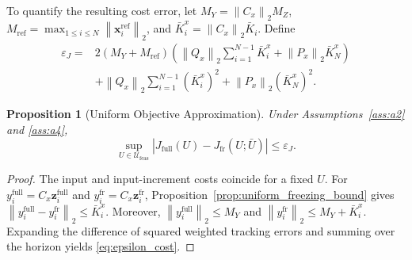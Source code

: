 \documentclass[journal]{IEEEtran}
\newtheorem{proposition}{Proposition}
\newcommand{\vx}{\mathbf{x}}
\newcommand{\vz}{\mathbf{z}}
\newcommand{\norm}[1]{\left\lVert #1\right\rVert}
\begin{document}
To quantify the resulting cost error, let $M_Y=\norm{C_x}_2M_Z$, $M_{\mathrm{ref}}=\max_{1\le i\le N}\norm{\vx_i^{\mathrm{ref}}}_2$, and $\bar K_i^x=\norm{C_x}_2\bar K_i$. Define
\begin{equation}
\begin{aligned}
\varepsilon_J={}&2(M_Y+M_{\mathrm{ref}})
 \left(\norm{Q_x}_2\sum_{i=1}^{N-1}\bar K_i^x
 +\norm{P_x}_2\bar K_N^x\right)\\
&+\norm{Q_x}_2\sum_{i=1}^{N-1}(\bar K_i^x)^2
 +\norm{P_x}_2(\bar K_N^x)^2.
\end{aligned}
\label{eq:epsilon_cost}
\end{equation}
\begin{proposition}[Uniform Objective Approximation]
\label{prop:uniform_cost_certificate}
Under Assumptions~\ref{ass:a2} and \ref{ass:a4},
\begin{equation}
 \sup_{U\in\mathcal U_{\mathrm{feas}}}
 \left|J_{\mathrm{full}}(U)-J_{\mathrm{fr}}(U;\bar U)\right|\le\varepsilon_J.
 \label{eq:uniform_cost_certificate}
\end{equation}
\end{proposition}
\begin{proof}
The input and input-increment costs coincide for a fixed $U$. For $y_i^{\mathrm{full}}=C_x\vz_i^{\mathrm{full}}$ and $y_i^{\mathrm{fr}}=C_x\vz_i^{\mathrm{fr}}$, Proposition~\ref{prop:uniform_freezing_bound} gives $\norm{y_i^{\mathrm{full}}-y_i^{\mathrm{fr}}}_2\le\bar K_i^x$. Moreover, $\norm{y_i^{\mathrm{full}}}_2\le M_Y$ and $\norm{y_i^{\mathrm{fr}}}_2\le M_Y+\bar K_i^x$. Expanding the difference of squared weighted tracking errors and summing over the horizon yields \eqref{eq:epsilon_cost}.
\end{proof}
\end{document}
